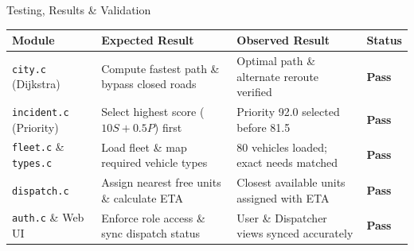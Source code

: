 \documentclass[aspectratio=169,11pt]{beamer}
\begin{document}
\begin{frame}{Testing, Results \& Validation}
\footnotesize
\begin{center}
\renewcommand{\arraystretch}{1.35}
\begin{tabularx}{.96\textwidth}{@{}p{2.8cm}X X p{1.2cm}@{}}
\toprule
Module & Expected Result & Observed Result & Status\\
\midrule
\texttt{city.c} (Dijkstra) & Compute fastest path \& bypass closed roads & Optimal path \& alternate reroute verified & \textbf{\color{green!50!black}Pass}\\
\texttt{incident.c} (Priority) & Select highest score ($10S + 0.5P$) first & Priority 92.0 selected before 81.5 & \textbf{\color{green!50!black}Pass}\\
\texttt{fleet.c} \& \texttt{types.c} & Load fleet \& map required vehicle types & 80 vehicles loaded; exact needs matched & \textbf{\color{green!50!black}Pass}\\
\texttt{dispatch.c} & Assign nearest free units \& calculate ETA & Closest available units assigned with ETA & \textbf{\color{green!50!black}Pass}\\
\texttt{auth.c} \& Web UI & Enforce role access \& sync dispatch status & User \& Dispatcher views synced accurately & \textbf{\color{green!50!black}Pass}\\
\bottomrule
\end{tabularx}
\end{center}
\end{frame}
\end{document}
